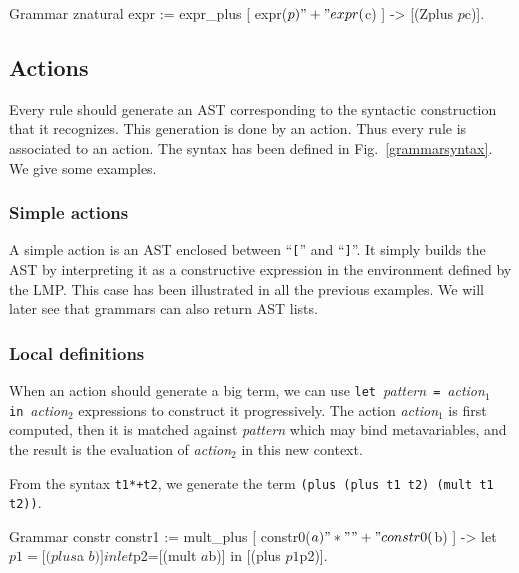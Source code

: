{\begin{coq_example*}
Grammar znatural expr :=
  expr_plus [ expr($p) "+" expr($c) ] -> [(Zplus $p $c)].
\end{coq_example*}



\subsection{Actions}
\label{GramAction}

Every rule should generate an AST corresponding to the syntactic
construction that it recognizes. This generation is done by an
action. Thus every rule is associated to an action. The syntax has
been defined in Fig.~\ref{grammarsyntax}. We give some examples.

\subsubsection{Simple actions}

A simple action is an AST enclosed between ``\verb+[+'' and
``\verb+]+''. It simply builds the AST by interpreting it as a
constructive expression in the environment defined by the LMP. This
case has been illustrated in all the previous examples.  We will later
see that grammars can also return AST lists.


\subsubsection{Local definitions}

When an action should generate a big term, we can use
\texttt{let}~\textsl{pattern}~\texttt{=}~\textsl{action}$_1$~%
\texttt{in}~\textsl{action}$_2$ expressions to
construct it progressively. The action \textsl{action}$_1$ is first
computed, then it is matched against \textsl{pattern} which may bind
metavariables, and the result is the evaluation of \textsl{action}$_2$
in this new context.

\example{}

\noindent From the syntax \verb|t1*+t2|, we generate the term
{\tt (plus (plus t1 t2) (mult t1 t2))}.

\begin{coq_example}
Grammar constr constr1 := 
  mult_plus [ constr0($a) "*" "+" constr0($b) ]
     -> let $p1=[(plus $a $b)] in
        let $p2=[(mult $a $b)] in 
          [(plus $p1 $p2)].
\end{coq_example}

}
